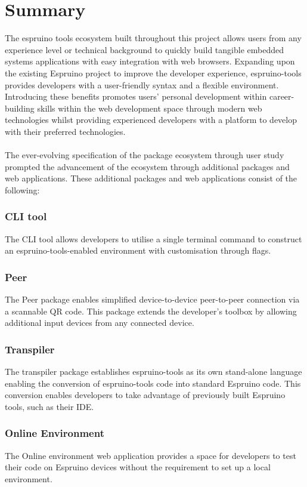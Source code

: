 \documentclass{l4proj}
\begin{document}
\section{Summary}
The espruino tools ecosystem built throughout this project allows users from any experience level or technical background to quickly build tangible embedded systems applications with easy integration with web browsers. Expanding upon the existing Espruino project to improve the developer experience, espruino-tools provides developers with a user-friendly syntax and a flexible environment. Introducing these benefits promotes users' personal development within career-building skills within the web development space through modern web technologies whilst providing experienced developers with a platform to develop with their preferred technologies. 
\\ \\
The ever-evolving specification of the package ecosystem through user study prompted the advancement of the ecosystem through additional packages and web applications. These additional packages and web applications consist of the following: 

\subsubsection{CLI tool} The CLI tool allows developers to utilise a single terminal command to construct an espruino-tools-enabled environment with customisation through flags.
\subsubsection{Peer} The Peer package enables simplified device-to-device peer-to-peer connection via a scannable QR code. This package extends the developer's toolbox by allowing additional input devices from any connected device.
\subsubsection{Transpiler} The transpiler package establishes espruino-tools as its own stand-alone language enabling the conversion of espruino-tools code into standard Espruino code. This conversion enables developers to take advantage of previously built Espruino tools, such as their IDE.
\subsubsection{Online Environment} The Online environment web application provides a space for developers to test their code on Espruino devices without the requirement to set up a local environment.
\end{document}
